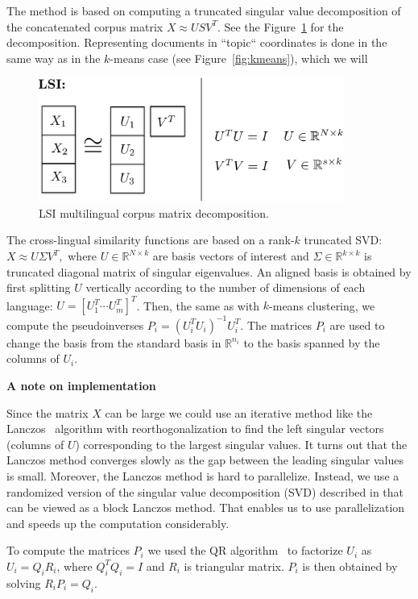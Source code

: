 \documentclass[twoside,11pt]{article}
\newcommand{\RR}{\mathbb{R}}
\begin{document}
 The method is based on computing a truncated singular value decomposition of the concatenated corpus matrix $X \approx U S V^T$. See the Figure~\ref{fig:lsi} for the decomposition. Representing documents in ``topic`` coordinates is done in the same way as in the $k$-means case (see Figure~\ref{fig:kmeans}), which we will

\begin{figure}[tbp]
\centering
\includegraphics[width=10cm]{lsi.pdf}
\caption{\label{fig:lsi} LSI multilingual corpus matrix decomposition.}
\end{figure}

The cross-lingual similarity functions are based on a rank-$k$ truncated SVD: $X \approx U \Sigma V^T,$ where $U \in \RR^{N \times k}$ are basis vectors of interest and $\Sigma \in \RR^{k \times k}$ is truncated diagonal matrix of singular eigenvalues. An aligned basis is obtained by first splitting $U$ vertically according to the number of dimensions of each language: $U = [U_1^T \cdots U_m^T]^T$. Then, the same as with $k$-means clustering, we compute the pseudoinverses $P_i = (U_i^T U_i)^{-1} U_i^T$. The matrices $P_i$ are used to change the basis from the standard basis in $\RR^{n_i}$ to the basis spanned by the columns of $U_i$.

\textbf{A note on implementation}

  Since the matrix $X$ can be large we could use an iterative method like the Lanczos~\cite{golub} algorithm with reorthogonalization to find the left singular vectors (columns of $U$) corresponding to the largest singular values. It turns out that the Lanczos method converges slowly as the gap between the leading singular values is small. Moreover, the Lanczos method is hard to parallelize. Instead, we use a randomized version of the singular value decomposition (SVD) described in  that can be viewed as a block Lanczos method. That enables us to use parallelization and speeds up the computation considerably.

To compute the matrices $P_i$ we used the QR algorithm~\cite{golub} to factorize $U_i$ as $U_i = Q_i R_i$, where $Q_i^TQ_i = I$ and $R_i$ is triangular matrix. $P_i$ is then obtained by solving $R_i P_i = Q_i$.
\end{document}
